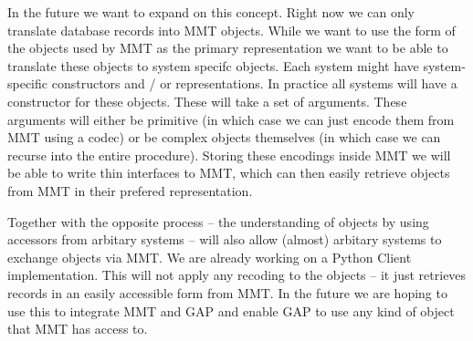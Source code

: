 \documentclass{deliverablereport}
\begin{document}
In the future we want to expand on this concept. Right now we can only translate database records into MMT objects. While we want to use the form of the objects used by MMT as the primary representation we want to be able to translate these objects to system specifc objects. Each system might have system-specific constructors and / or representations. In practice all systems will have a constructor for these objects. These will take a set of arguments. These arguments will either be primitive (in which case we can just encode them from MMT using a codec) or be complex objects themselves (in which case we can recurse into the entire procedure). Storing these encodings inside MMT we will be able to write thin interfaces to MMT, which can then easily retrieve objects from MMT in their prefered representation.

Together with the opposite process -- the understanding of objects by using accessors from arbitary systems -- will also allow (almost) arbitary systems to exchange objects via MMT. We are already working on a Python Client implementation. This will not apply any recoding to the objects -- it just retrieves records in an easily accessible form from MMT. In the future we are hoping to use this to integrate MMT and GAP and enable GAP to use any kind of object that MMT has access to.

\newpage\printbibliography

\appendix

\end{document}
